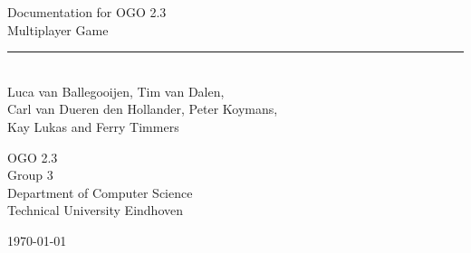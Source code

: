 \begin{titlepage}
	\begin{center}
		
		{\Huge Documentation for OGO 2.3\\ Multiplayer Game}\\[0.5cm]
		\rule{\linewidth}{0.5mm}\\[0.5cm]
		
		
		{\Large
		Luca van Ballegooijen, Tim van Dalen, \\
		Carl van Dueren den Hollander, Peter Koymans,\\
		Kay Lukas and Ferry Timmers\\[1cm]
		}
		
		{\large
		OGO 2.3\\
		Group 3 \\[1cm]
		Department of Computer Science\\
		Technical University Eindhoven\\[1cm]
		}
		
		

		\vfill

		{\large \today}
	\end{center}
\end{titlepage}
